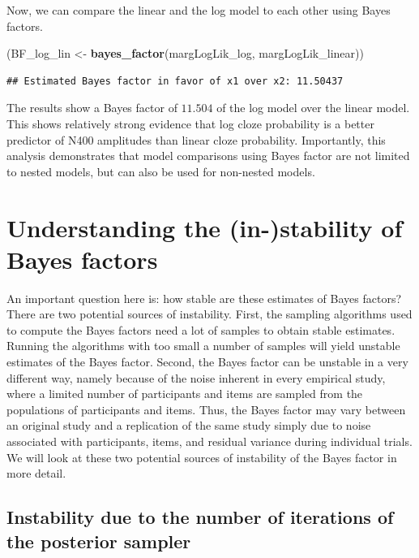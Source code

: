\documentclass[12pt,]{krantz}
\newenvironment{Shaded}{\begin{snugshade}}{\end{snugshade}}
\newcommand{\KeywordTok}[1]{\textcolor[rgb]{0.13,0.29,0.53}{\textbf{#1}}}
\newcommand{\NormalTok}[1]{#1}
\newcommand{\StringTok}[1]{\textcolor[rgb]{0.31,0.60,0.02}{#1}}
\theoremstyle{definition}
\theoremstyle{definition}
\theoremstyle{definition}
\theoremstyle{remark}
\begin{document}
Now, we can compare the linear and the log model to each other using Bayes factors.

\begin{Shaded}
\begin{Highlighting}[]
\NormalTok{(BF_log_lin <-}\StringTok{ }\KeywordTok{bayes_factor}\NormalTok{(margLogLik_log, margLogLik_linear))}
\end{Highlighting}
\end{Shaded}

\begin{verbatim}
## Estimated Bayes factor in favor of x1 over x2: 11.50437
\end{verbatim}

The results show a Bayes factor of \(11.504\) of the log model over the linear model. This shows relatively strong evidence that log cloze probability is a better predictor of N400 amplitudes than linear cloze probability. Importantly, this analysis demonstrates that model comparisons using Bayes factor are not limited to nested models, but can also be used for non-nested models.

\hypertarget{understanding-the-in-stability-of-bayes-factors}{%
\section{Understanding the (in-)stability of Bayes factors}\label{understanding-the-in-stability-of-bayes-factors}}

An important question here is: how stable are these estimates of Bayes factors? There are two potential sources of instability. First, the sampling algorithms used to compute the Bayes factors need a lot of samples to obtain stable estimates. Running the algorithms with too small a number of samples will yield unstable estimates of the Bayes factor. Second, the Bayes factor can be unstable in a very different way, namely because of the noise inherent in every empirical study, where a limited number of participants and items are sampled from the populations of participants and items. Thus, the Bayes factor may vary between an original study and a replication of the same study simply due to noise associated with participants, items, and residual variance during individual trials. We will look at these two potential sources of instability of the Bayes factor in more detail.

\hypertarget{instability-due-to-the-number-of-iterations-of-the-posterior-sampler}{%
\subsection{Instability due to the number of iterations of the posterior sampler}\label{instability-due-to-the-number-of-iterations-of-the-posterior-sampler}}
\end{document}
